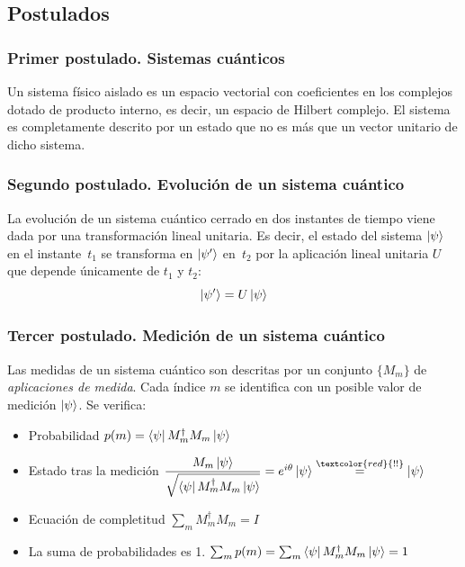 \documentclass{beamer}
\begin{document}
\subsection*{Postulados}
\begin{frame}
	\frametitle{Primer postulado. Sistemas cuánticos}
	
	\begin{postulate} Un sistema físico aislado es un espacio vectorial con coeficientes en los complejos dotado de producto interno, es decir, un espacio de Hilbert complejo. El sistema es completamente descrito por un estado que no es más que un vector unitario de dicho sistema.
\end{postulate}
\end{frame}

\begin{frame}
	\frametitle{Segundo postulado. Evolución de un sistema cuántico}
	
	\begin{postulate} La evolución de un sistema cuántico cerrado en dos instantes de tiempo viene dada por una transformación lineal unitaria. Es decir, el estado del sistema $\left|\psi\right\rangle$ en el instante~$t_1$ se transforma en $\left|\psi'\right\rangle$ en~$t_2$ por la aplicación lineal unitaria $U$ que depende únicamente de $t_1$ y $t_2$:
\[\left|\psi'\right\rangle=U\left|\psi\right\rangle\]
\end{postulate}
\end{frame}

\begin{frame}
	\frametitle{Tercer postulado. Medición de un sistema cuántico}
	
	\begin{postulate} Las medidas de un sistema cuántico son descritas por un conjunto $\{M_m \}$ de \textit{aplicaciones de medida}. Cada índice $m$ se identifica con un posible valor de medición $\left|\psi\right\rangle$. Se verifica:
	
	\begin{itemize}
	\item Probabilidad $p(m)=\left\langle\psi\right|M_m^\dag M_m\left|\psi\right\rangle$
	\item Estado tras la medición $\dfrac{M_m\ket{\psi}}{\sqrt{\bra{\psi}M_m^\dag M_m\ket{\psi}}}=e^{i\theta}\ket\psi\overset{\textcolor{red}{!!}}=\ket\psi$
	\item Ecuación de completitud $\sum_m M_m^\dag M_m = I$
	\item La suma de probabilidades es 1. $\sum_m p(m)=\sum_m \left\langle\psi\right|M_m^\dag M_m\left|\psi\right\rangle = 1$
	\end{itemize}
\end{postulate}
\end{frame}
\end{document}
